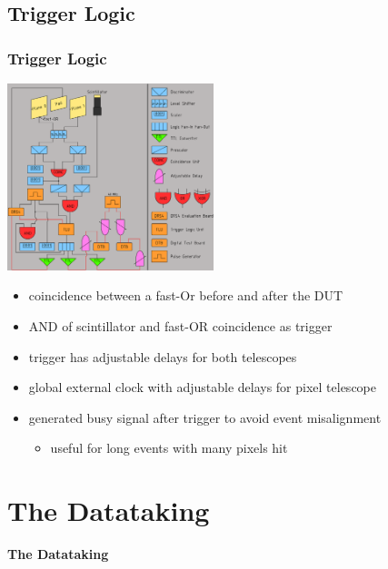 \documentclass[9pt]{beamer}
\begin{document}
\subsection{Trigger Logic}
\begin{frame}
	\frametitle{Trigger Logic}
	\begin{center}
		\begin{minipage}{6cm}
			\centering
			\includegraphics[width=6cm]{Pics/triglog2}
		\end{minipage}
		\hspace*{2pt}
		\begin{minipage}{5cm}
			\begin{itemize}
				\item coincidence between a fast-Or before and after the DUT
				\item AND of scintillator and fast-OR coincidence as trigger
				\item trigger has adjustable delays for both telescopes
				\item global external clock with adjustable delays for pixel telescope
				\item generated busy signal after trigger to avoid event misalignment
				\begin{itemize}
					\item useful for long events with many pixels hit 
				\end{itemize}
			\end{itemize}
		\end{minipage}\no\s
	\end{center}
\end{frame}
\section{The Datataking}
\begin{frame}
	\begin{alertblock}{
		\begin{center}
			\Large{\textbf{The Datataking}}
		\end{center}}
	\end{alertblock}
\end{frame}
\end{document}
